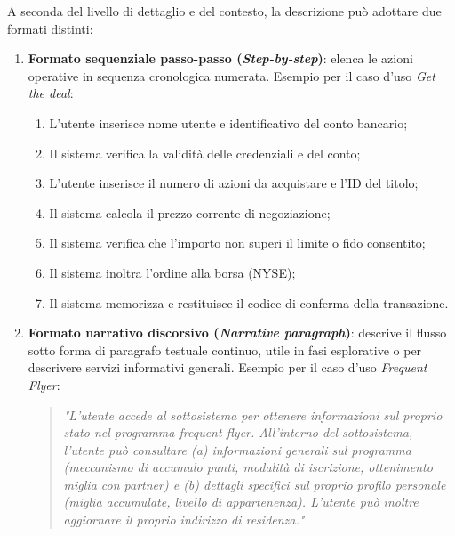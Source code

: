 \documentclass[12pt]{extarticle}
\begin{document}
\noindent A seconda del livello di dettaglio e del contesto, la descrizione può adottare due formati distinti:
\begin{enumerate}
    \item \textbf{Formato sequenziale passo-passo (\textit{Step-by-step})}: elenca le azioni operative in sequenza cronologica numerata. Esempio per il caso d'uso \textit{Get the deal}:
    \begin{enumerate}
        \item L'utente inserisce nome utente e identificativo del conto bancario;
        \item Il sistema verifica la validità delle credenziali e del conto;
        \item L'utente inserisce il numero di azioni da acquistare e l'ID del titolo;
        \item Il sistema calcola il prezzo corrente di negoziazione;
        \item Il sistema verifica che l'importo non superi il limite o fido consentito;
        \item Il sistema inoltra l'ordine alla borsa (NYSE);
        \item Il sistema memorizza e restituisce il codice di conferma della transazione.
    \end{enumerate}
    \item \textbf{Formato narrativo discorsivo (\textit{Narrative paragraph})}: descrive il flusso sotto forma di paragrafo testuale continuo, utile in fasi esplorative o per descrivere servizi informativi generali. Esempio per il caso d'uso \textit{Frequent Flyer}:
    \begin{quote}
        \textit{"L'utente accede al sottosistema per ottenere informazioni sul proprio stato nel programma frequent flyer. All'interno del sottosistema, l'utente può consultare (a) informazioni generali sul programma (meccanismo di accumulo punti, modalità di iscrizione, ottenimento miglia con partner) e (b) dettagli specifici sul proprio profilo personale (miglia accumulate, livello di appartenenza). L'utente può inoltre aggiornare il proprio indirizzo di residenza."}
    \end{quote}
\end{enumerate}
\end{document}
